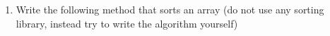 \documentclass[12pt,letterpaper]{article}
\begin{document}
\begin{enumerate}
\item
Write the following method that sorts an array (do not use any sorting library, instead try to write the algorithm yourself)

\end{enumerate}
\end{document}
